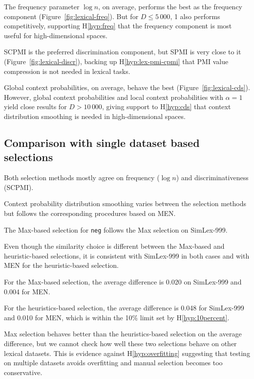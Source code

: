 
The frequency parameter $\log n$, on average, performs the best as the frequency component (Figure~\ref{fig:lexical-freq}). But for $D \leq 5\,000$, 1 also performs competitively, supporting H\ref{hyp:freq} that the frequency component is most useful for high-dimensional spaces.

SCPMI is the preferred discrimination component, but SPMI is very close to it (Figure~\ref{fig:lexical-discr}), backing up H\ref{hyp:lex-pmi-cpmi} that PMI value compression is not needed in lexical tasks.


Global context probabilities, on average, behave the best (Figure~\ref{fig:lexical-cds}). However, global context probabilities and local context probabilities with $\alpha = 1$ yield close results for $D > 10\,000$, giving support to H\ref{hyp:cds} that context distribution smoothing is needed in high-dimensional spaces.

\subsection{Comparison with single dataset based selections}

Both selection methods mostly agree on frequency ($\log n$) and discriminativeness (SCPMI).

Context probability distribution smoothing varies between the selection methods but follows the corresponding procedures based on MEN.

The Max-based selection for \texttt{neg} follows the Max selection on SimLex-999.

Even though the similarity choice is different between the Max-based and heuristic-based selections, it is consistent with SimLex-999 in both cases and with MEN for the heuristic-based selection.

For the Max-based selection, the average difference is 0.020 on SimLex-999 and 0.004 for MEN.

For the heuristics-based selection, the average difference is 0.048 for SimLex-999 and 0.010 for MEN, which is within the 10\% limit set by H\ref{hyp:10percent}.

Max selection behaves better than the heuristics-based selection on the average difference, but we cannot check how well these two selections behave on other lexical datasets. This is evidence against H\ref{hyp:overfitting} suggesting that testing on multiple datasets avoids overfitting and manual selection becomes too conservative.

